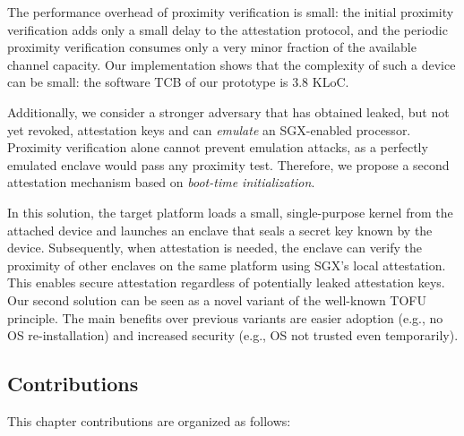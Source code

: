 The performance overhead of proximity verification is small: the initial
proximity verification adds only a small delay to the attestation protocol, and
the periodic proximity verification consumes only a very minor fraction of
the available  channel capacity. Our implementation shows that the complexity of such a device can be small: the software TCB of our prototype is 3.8 KLoC.


 Additionally, we consider a stronger adversary that has obtained leaked, but not yet revoked, attestation keys and can \emph{emulate} an SGX-enabled processor.
%
Proximity verification alone cannot prevent emulation attacks, as a perfectly emulated enclave would pass any proximity test. Therefore, we propose a second attestation mechanism based on \emph{boot-time initialization}. 

In this solution, the target platform loads a small, single-purpose kernel from the attached device and launches an enclave that seals a secret key known by the device. 
Subsequently, when attestation is needed, the enclave can verify the proximity of other enclaves on the same platform using SGX's local attestation. This enables secure attestation regardless of potentially leaked attestation keys. Our second solution can be seen as a novel variant of the well-known TOFU principle. The main benefits over previous variants are easier adoption (e.g., no OS re-installation) and increased security (e.g., OS not trusted even temporarily).


\subsection{Contributions} This chapter contributions are organized as follows:

